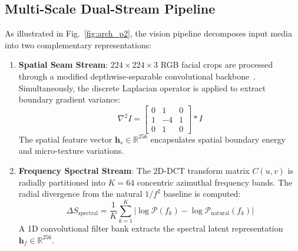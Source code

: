 \documentclass[journal]{IEEEtran}
\begin{document}
\subsection{Multi-Scale Dual-Stream Pipeline}
As illustrated in Fig.~\ref{fig:arch_p2}, the vision pipeline decomposes input media into two complementary representations:
\begin{enumerate}
    \item \textbf{Spatial Seam Stream}: $224 \times 224 \times 3$ RGB facial crops are processed through a modified depthwise-separable convolutional backbone~\cite{sandler2018mobilenetv2}. Simultaneously, the discrete Laplacian operator is applied to extract boundary gradient variance:
    \begin{equation}
    \nabla^2 I = \begin{bmatrix} 0 & 1 & 0 \\ 1 & -4 & 1 \\ 0 & 1 & 0 \end{bmatrix} * I
    \end{equation}
    The spatial feature vector $\mathbf{h}_s \in \mathbb{R}^{256}$ encapsulates spatial boundary energy and micro-texture variations.
    \item \textbf{Frequency Spectral Stream}: The 2D-DCT transform matrix $C(u, v)$ is radially partitioned into $K = 64$ concentric azimuthal frequency bands. The radial divergence from the natural $1/f^2$ baseline is computed:
    \begin{equation}
    \Delta S_{\text{spectral}} = \frac{1}{K} \sum_{k=1}^K \left| \log \mathcal{P}(f_k) - \log \mathcal{P}_{\text{natural}}(f_k) \right|
    \end{equation}
    A 1D convolutional filter bank extracts the spectral latent representation $\mathbf{h}_f \in \mathbb{R}^{256}$.
\end{enumerate}
\end{document}
